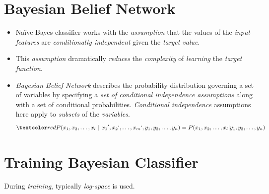 \documentclass[
	number={3},
	title={Na\"iive Bayes Learning}
]{cs584notes}
\begin{document}
\section{Bayesian Belief Network}\label{sec:bayesian-belief-network}
\begin{itemize}
	\item Naïve Bayes classifier works with the \emph{assumption} that the values of the \emph{input features} are \emph{conditionally independent} given the \emph{target value}.
	\item This \emph{assumption} dramatically \emph{reduces} the \emph{complexity} of \emph{learning} the \emph{target function}.
	\item \emph{Bayesian Belief Network} describes the probability distribution governing a set of variables by specifying a \emph{set of conditional independence assumptions} along with a set of conditional probabilities. \emph{Conditional independence} assumptions here apply to \emph{subsets} of the \emph{variables}.
	\[ \data{ P(x_{1}, x_{2}, \dots, x_{l}\ |\ x_{1}{'}, x_{2}{`}, \dots, x_{m}{`}, y_{1}, y_{2}, \dots, y_{n}) = P(x_{1}, x_{2}, \dots, x_{l} | y_{1}, y_{2}, \dots, y_{n}) } \]
\end{itemize}

\section{Training Bayesian Classifier}\label{sec:training-bayesian-classifier}
During \emph{training}, typically \emph{log-space} is used.

\end{document}
